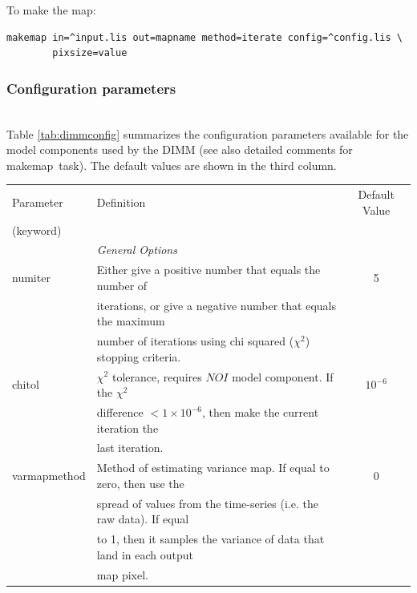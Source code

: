\documentclass[twoside,11pt]{article}
\newcommand{\xref}[3]{#1}
\renewcommand{\_}{\texttt{\symbol{95}}}
\newcommand{\task}[1]{\textsf{#1}}
\newcommand{\makemap}{\xref{\task{makemap}}{sun258}{MAKEMAP}}
\begin{document}
To make the map:
\begin{verbatim}
makemap in=^input.lis out=mapname method=iterate config=^config.lis \
        pixsize=value
\end{verbatim}


\subsubsection{Configuration parameters} \ \\

Table \ref{tab:dimmconfig} summarizes the configuration parameters
available for the model components used by the DIMM (see also detailed
comments for \makemap\ task). The default values are shown in the
third column.

\begin{table}
\footnotesize
\centering
\begin{tabular}{llc}
\hline
Parameter        & Definition                                                         &  Default Value \\
(keyword)        &                                                                    & \\
\hline
                 & \multicolumn{2}{l}{\em General Options} \\
\hline
numiter          & Either give a positive number that equals the number of             & 5\\
                 & iterations, or give a negative number that equals the maximum       & \\
                 & number of iterations using chi squared ($\chi^2$) stopping criteria.& \\
chitol           & $\chi^2$ tolerance, requires $NOI$ model component. If the $\chi^2$ & $10^{-6}$\\
                 & difference $<1\times10^{-6}$, then make the current iteration the   & \\
                 & last iteration.                                                     & \\
varmapmethod     & Method of estimating variance map. If equal to zero, then use the   & 0 \\
                 & spread of values from the time-series (i.e. the raw data). If equal & \\
                 & to 1, then it samples the variance of data that land in each output & \\
                 & map pixel.                                                          & \\

\end{tabular}
\end{table}
\end{document}
